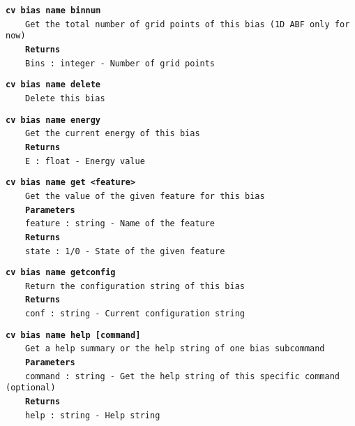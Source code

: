 \begin{mdexampleinput}{}
\texttt{\textbf{cv bias name binnum}}
\\
\-~~~~\texttt{Get the total number of grid points of this bias (1D ABF only for now)}
\\
\-~~~~\texttt{\textbf{Returns}}
\\
\-~~~~\texttt{Bins : integer - Number of grid points}
\end{mdexampleinput}
\begin{mdexampleinput}{}
\texttt{\textbf{cv bias name delete}}
\\
\-~~~~\texttt{Delete this bias}
\end{mdexampleinput}
\begin{mdexampleinput}{}
\texttt{\textbf{cv bias name energy}}
\\
\-~~~~\texttt{Get the current energy of this bias}
\\
\-~~~~\texttt{\textbf{Returns}}
\\
\-~~~~\texttt{E : float - Energy value}
\end{mdexampleinput}
\begin{mdexampleinput}{}
\texttt{\textbf{cv bias name get <feature>}}
\\
\-~~~~\texttt{Get the value of the given feature for this bias}
\\
\-~~~~\texttt{\textbf{Parameters}}
\\
\-~~~~\texttt{feature : string - Name of the feature}
\\
\-~~~~\texttt{\textbf{Returns}}
\\
\-~~~~\texttt{state : 1/0 - State of the given feature}
\end{mdexampleinput}
\begin{mdexampleinput}{}
\texttt{\textbf{cv bias name getconfig}}
\\
\-~~~~\texttt{Return the configuration string of this bias}
\\
\-~~~~\texttt{\textbf{Returns}}
\\
\-~~~~\texttt{conf : string - Current configuration string}
\end{mdexampleinput}
\begin{mdexampleinput}{}
\texttt{\textbf{cv bias name help [command]}}
\\
\-~~~~\texttt{Get a help summary or the help string of one bias subcommand}
\\
\-~~~~\texttt{\textbf{Parameters}}
\\
\-~~~~\texttt{command : string - Get the help string of this specific command (optional)}
\\
\-~~~~\texttt{\textbf{Returns}}
\\
\-~~~~\texttt{help : string - Help string}
\end{mdexampleinput}

